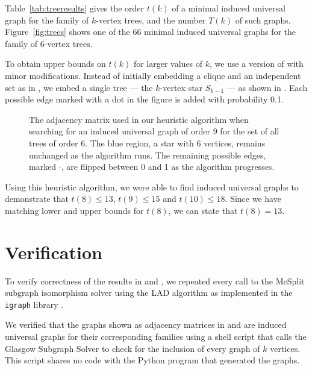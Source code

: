 \documentclass[12pt]{article}
\begin{document}
Table~\ref{tab:treeresults} gives the order $t(k)$ of a minimal induced universal graph for
the family of $k$-vertex trees, and the number $T(k)$ of such graphs.  Figure~\ref{fig:trees}
shows one of the 66 minimal induced universal graphs for the family of 6-vertex trees.

To obtain upper bounds on $t(k)$ for larger values of $k$, we use a version of
 with minor modifications.  Instead of initially embedding
a clique and an independent set as in , we embed
a single tree --- the $k$-vertex star $S_{k-1}$ --- as shown in
.  Each possible edge marked with a dot
in the figure is added with probability 0.1.

\begin{figure}[h!]
    \centering
    \footnotesize
    \caption{The adjacency matrix used in our heuristic algorithm when searching
        for an induced universal graph of order 9 for the set of all trees
        of order 6.  The blue
        region, a star with 6 vertices, remains unchanged as the algorithm runs.
        The remaining possible edges, marked $\boldsymbol{\cdot}$,
        are flipped between 0 and 1 as the algorithm progresses.}
\label{fig:heuristic-regions-for-trees}
\end{figure}

Using this heuristic algorithm, we were able to find induced universal graphs
to demonstrate that $t(8) \leq 13$, $t(9) \leq 15$ and $t(10) \leq 18$.
Since we have matching lower and upper bounds for $t(8)$, we can state
that $t(8) = 13$.

\section{Verification}\label{sec:verification}

To verify correctness of the results in
 and , we repeated every call to
the McSplit subgraph isomorphism solver using the LAD algorithm \cite{DBLP:journals/ai/Solnon10}
as implemented in the \texttt{igraph} library \cite{igraph}.

We verified that the graphs shown as adjacency matrices in 
and  are induced universal graphs for their corresponding families
using a shell script that calls the Glasgow Subgraph Solver \cite{DBLP:conf/cp/McCreeshP15,DBLP:conf/gg/McCreeshP020} to check for the
inclusion of every graph of $k$ vertices.
This script shares no code with the Python program that generated the graphs.
\end{document}

